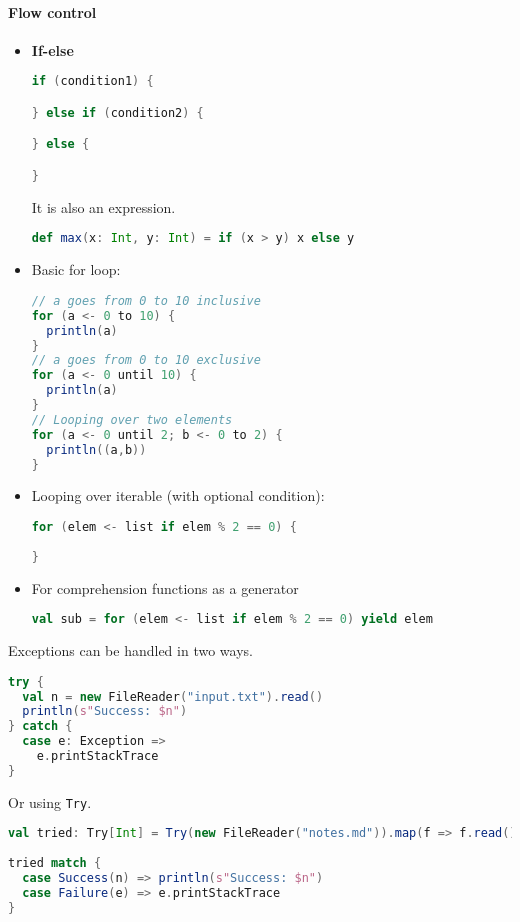 \paragraph{Flow control}
\begin{itemize}
\item \textbf{If-else}
\begin{lstlisting}[language=scala, style=snippet]
if (condition1) {

} else if (condition2) {

} else {

}
\end{lstlisting}
It is also an expression.
\begin{lstlisting}[language=scala, style=snippet]
def max(x: Int, y: Int) = if (x > y) x else y
\end{lstlisting}
\item Basic for loop:
\begin{lstlisting}[language=scala, style=snippet]
// a goes from 0 to 10 inclusive
for (a <- 0 to 10) {
  println(a)
}
// a goes from 0 to 10 exclusive
for (a <- 0 until 10) {
  println(a)
}
// Looping over two elements
for (a <- 0 until 2; b <- 0 to 2) {
  println((a,b))
}
\end{lstlisting}
\item Looping over iterable (with optional condition):
\begin{lstlisting}[language=scala, style=snippet]
for (elem <- list if elem % 2 == 0) {
  
}
\end{lstlisting}
\item For comprehension functions as a generator
\begin{lstlisting}[language=scala, style=snippet]
val sub = for (elem <- list if elem % 2 == 0) yield elem
\end{lstlisting}
\end{itemize}
Exceptions can be handled in two ways.
\begin{lstlisting}[language=scala, style=snippet]
try {
  val n = new FileReader("input.txt").read()
  println(s"Success: $n")
} catch {
  case e: Exception =>
    e.printStackTrace
}
\end{lstlisting}
Or using \texttt{Try}.
\begin{lstlisting}[language=scala, style=snippet]
val tried: Try[Int] = Try(new FileReader("notes.md")).map(f => f.read())
    
tried match {
  case Success(n) => println(s"Success: $n")
  case Failure(e) => e.printStackTrace
}
\end{lstlisting}

